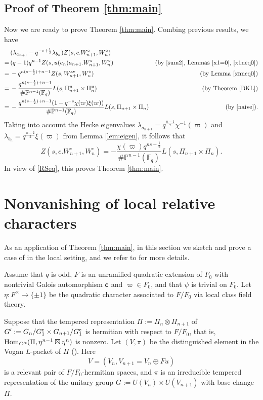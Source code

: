 \documentclass[11pt, a4paper]{amsart}
\newcommand{\Hom}{{\mathrm{Hom}}}
\theoremstyle{plain}
\theoremstyle{plain}
\theoremstyle{plain}
\theoremstyle{plain}
\theoremstyle{remark}
\theoremstyle{definition}
\theoremstyle{plain}
\numberwithin{equation}{section}
\begin{document}
\subsection{Proof of Theorem \ref{thm:main}} Now we are ready to prove Theorem \ref{thm:main}. Combing previous results, we have 
\[
\begin{aligned}
& (\lambda_{a_{n+1}} - q^{-s+\frac{1}{2}} \lambda_{b_n})Z(s, c.W_{n+1}^\circ, W_n^\circ) & \\
=\, &   (q-1)q^{n-1} Z(s, u(e_n)a_{n+1}.W_{n+1}^\circ, W_n^\circ)  &  (\text{by \eqref{sum2}, Lemmas \ref{x1=0}, \ref{x1neq0}}) \\
=\, &  -q^{n(s-\frac{1}{2})+n-1} Z(s, W_{n+1}^{\rm av}, W_n^\circ)  &  (\text{by Lemma \ref{xnneq0}}) \\
=\, & -\frac{q^{n(s-\frac{1}{2})+n-1}}{\#\mathbb{P}^{n-1}(\mathbb{F}_q)} L(s, \Pi_{n+1}^u\times \Pi_n^u) & (\text{by Theorem \ref{BKL}})\\
=\, & -\frac{q^{n(s-\frac{1}{2})+n-1}(1-q^{-s}\chi(\varpi)\xi(\varpi))}{\#\mathbb{P}^{n-1}(\mathbb{F}_q)} L(s, \Pi_{n+1}\times \Pi_n) & (\text{by \eqref{naive}}).
\end{aligned}
\]
Taking into account the Hecke eigenvalues $\lambda_{a_{n+1}} = q^{\frac{n-1}{2}} \chi^{-1}(\varpi)$ and $\lambda_{b_n} = q^{\frac{n-2}{2}} \xi(\varpi)$ from Lemma \ref{lem:eigen}, it follows that 
\[
Z(s, c.W_{n+1}^\circ, W_n^\circ) = -\frac{\chi(\varpi) q^{ns- \frac{1}{2}}}{ \# \mathbb{P}^{n-1}(\mathbb{F}_q)}
L(s,\Pi_{n+1}\times\Pi_n).
\]
In view of \eqref{RSeq}, this proves Theorem \ref{thm:main}.

\section{Nonvanishing of local relative characters} \label{sec:conj}

As an application of Theorem \ref{thm:main},  in this section we sketch and prove a case of \cite[Conjecture 3.6.10]{DZ} in the  local setting, and we refer to \cite[\S3]{DZ} for more details. 

Assume that $q$ is odd, $F$ is an unramified quadratic extension of $F_0$ with nontrivial Galois automorphism ${\sf c}$ and $\varpi\in F_0$, and that $\psi$ is trivial on $F_0$. Let $\eta: F^\times \to \{\pm1\}$ be the quadratic character associated to $F/F_0$ via local class field theory. 

Suppose that the tempered representation 
$\Pi := \Pi_{n}\otimes \Pi_{n+1}$ of $G':=G_{n}/G_1^{\sf c}\times G_{n+1}/G_1^{\sf c}$ is hermitian with respect to $F/F_0$, that is,
$
\Hom_{G'^{\sf c}}(\Pi, \eta^{n-1}\boxtimes\eta^n)
$
is nonzero.  Let $(V, \pi)$ be the distinguished element in the Vogan $L$-packet of $\Pi$ (\cite{GGP}). Here 
\[
V= (V_n, V_{n+1}= V_n \oplus Fu)
\]
is a relevant pair of $F/F_0$-hermitian spaces, and $\pi$ is an irreducible tempered 
representation of the unitary group $G:=U(V_n)\times U(V_{n+1})$ with base change $\Pi$. 
\end{document}
